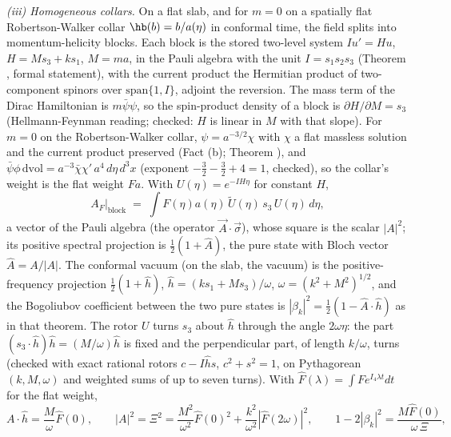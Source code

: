 \emph{(iii) Homogeneous collars.} On a flat slab, and for $m = 0$ on a spatially flat Robertson-Walker collar $\hb(b) = b/a(\eta)$ in conformal time, the field splits into momentum-helicity blocks. Each block is the stored two-level system $Iu' = Hu$, $H = Ms_{3} + ks_{1}$, $M = ma$, in the Pauli algebra with the unit $I = s_{1}s_{2}s_{3}$ (Theorem , formal statement), with the current product the Hermitian product of two-component spinors over $\mathrm{span}\{1, I\}$, adjoint the reversion. The mass term of the Dirac Hamiltonian is $m\bar\psi\psi$, so the spin-product density of a block is $\partial H/\partial M = s_{3}$ (Hellmann-Feynman reading; checked: $H$ is linear in $M$ with that slope). For $m = 0$ on the Robertson-Walker collar, $\psi = a^{-3/2}\chi$ with $\chi$ a flat massless solution and the current product preserved (Fact (b); Theorem ), and $\bar\psi\phi\,\mathrm{dvol} = a^{-3}\bar\chi\chi'\,a^{4}\,d\eta\,d^{3}x$ (exponent $-\tfrac32 - \tfrac32 + 4 = 1$, checked), so the collar's weight is the flat weight $Fa$. With $U(\eta) = e^{-IH\eta}$ for constant $H$,
\[
A_{F}\big|_{\mathrm{block}} \;=\; \int F(\eta)a(\eta)\,\tilde U(\eta)\,s_{3}\,U(\eta)\,d\eta,
\]
a vector of the Pauli algebra (the operator $\vec A\cdot\vec\sigma$), whose square is the scalar $|A|^{2}$; its positive spectral projection is $\tfrac12(1 + \hat A)$, the pure state with Bloch vector $\hat A = A/|A|$. The conformal vacuum (on the slab, the vacuum) is the positive-frequency projection $\tfrac12(1 + \hat h)$, $\hat h = (ks_{1} + Ms_{3})/\omega$, $\omega = (k^{2} + M^{2})^{1/2}$, and the Bogoliubov coefficient between the two pure states is $|\beta_{k}|^{2} = \tfrac12(1 - \hat A\cdot\hat h)$ as in that theorem. The rotor $U$ turns $s_{3}$ about $\hat h$ through the angle $2\omega\eta$: the part $(s_{3}\cdot\hat h)\hat h = (M/\omega)\hat h$ is fixed and the perpendicular part, of length $k/\omega$, turns (checked with exact rational rotors $c - I\hat h s$, $c^{2} + s^{2} = 1$, on Pythagorean $(k, M, \omega)$ and weighted sums of up to seven turns). With $\hat F(\lambda) = \int F e^{I_{4}\lambda t}dt$ for the flat weight,
\[
A\cdot\hat h = \frac{M}{\omega}\hat F(0), \qquad |A|^{2} = \Xi^{2} = \frac{M^{2}}{\omega^{2}}\hat F(0)^{2} + \frac{k^{2}}{\omega^{2}}|\hat F(2\omega)|^{2}, \qquad 1 - 2|\beta_{k}|^{2} = \frac{M\hat F(0)}{\omega\,\Xi},
\]

